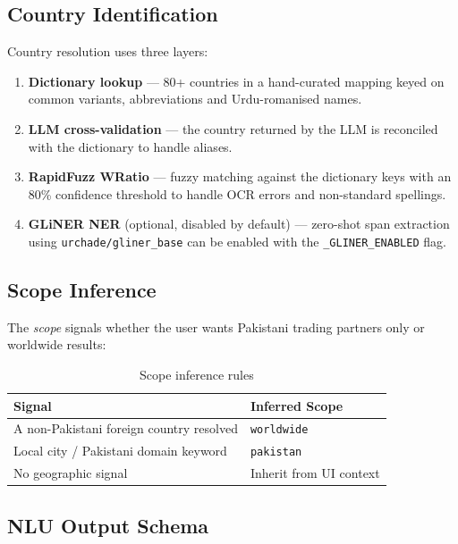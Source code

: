 \documentclass[12pt,a4paper]{article}
\begin{document}
\subsection{Country Identification}

Country resolution uses three layers:

\begin{enumerate}
  \item \textbf{Dictionary lookup} --- 80+ countries in a hand-curated mapping keyed on
        common variants, abbreviations and Urdu-romanised names.
  \item \textbf{LLM cross-validation} --- the country returned by the LLM is
        reconciled with the dictionary to handle aliases.
  \item \textbf{RapidFuzz WRatio} --- fuzzy matching against the dictionary keys with
        an 80\% confidence threshold to handle OCR errors and non-standard spellings.
  \item \textbf{GLiNER NER} (optional, disabled by default) --- zero-shot span
        extraction using \texttt{urchade/gliner\_base} can be enabled with the
        \texttt{\_GLINER\_ENABLED} flag.
\end{enumerate}

\subsection{Scope Inference}

The \emph{scope} signals whether the user wants Pakistani trading partners only or
worldwide results:

\begin{table}[H]
\centering
\renewcommand{\arraystretch}{1.3}
\begin{tabular}{p{6cm}l}
\toprule
\rowcolor{tableheader!20}
\textbf{Signal} & \textbf{Inferred Scope} \\
\midrule
A non-Pakistani foreign country resolved & \texttt{worldwide} \\
Local city / Pakistani domain keyword    & \texttt{pakistan} \\
No geographic signal                     & Inherit from UI context \\
\bottomrule
\end{tabular}
\caption{Scope inference rules}
\end{table}

\subsection{NLU Output Schema}
\end{document}
